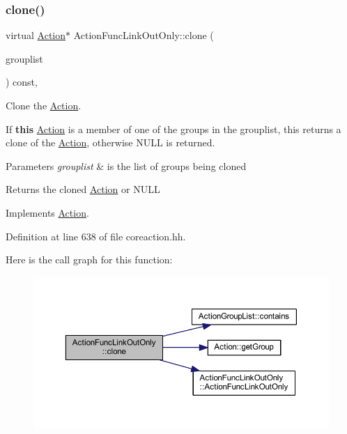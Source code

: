 \subsubsection{\texorpdfstring{clone()}{clone()}}
{\footnotesize\ttfamily virtual \mbox{\hyperlink{class_action}{Action}}$\ast$ Action\+Func\+Link\+Out\+Only\+::clone (\begin{DoxyParamCaption}\item[{const \mbox{\hyperlink{class_action_group_list}{Action\+Group\+List}} \&}]{grouplist }\end{DoxyParamCaption}) const\hspace{0.3cm}{\ttfamily [inline]}, {\ttfamily [virtual]}}



Clone the \mbox{\hyperlink{class_action}{Action}}. 

If {\bfseries{this}} \mbox{\hyperlink{class_action}{Action}} is a member of one of the groups in the grouplist, this returns a clone of the \mbox{\hyperlink{class_action}{Action}}, otherwise N\+U\+LL is returned. 
\begin{DoxyParams}{Parameters}
{\em grouplist} & is the list of groups being cloned \\
\hline
\end{DoxyParams}
\begin{DoxyReturn}{Returns}
the cloned \mbox{\hyperlink{class_action}{Action}} or N\+U\+LL 
\end{DoxyReturn}


Implements \mbox{\hyperlink{class_action_af8242e41d09e5df52f97df9e65cc626f}{Action}}.



Definition at line 638 of file coreaction.\+hh.

Here is the call graph for this function\+:
\nopagebreak
\begin{figure}[H]
\begin{center}
\leavevmode
\includegraphics[width=350pt]{class_action_func_link_out_only_aea7020b6da99752e4bf1b3edc3a5de53_cgraph}
\end{center}
\end{figure}


